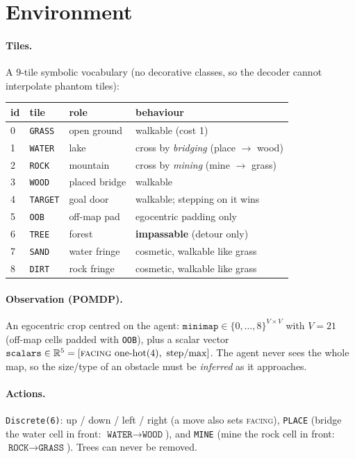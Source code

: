 \documentclass[11pt]{article}
\newcommand{\code}[1]{\texttt{#1}}
\begin{document}
\section{Environment}

\paragraph{Tiles.} A $9$-tile symbolic vocabulary (no decorative classes, so the
decoder cannot interpolate phantom tiles):
\begin{center}\small
\begin{tabular}{@{}llll@{}}
\toprule
id & tile & role & behaviour\\
\midrule
0 & \code{GRASS}  & open ground & walkable (cost 1)\\
1 & \code{WATER}  & lake        & cross by \emph{bridging} (place $\to$ wood)\\
2 & \code{ROCK}   & mountain    & cross by \emph{mining} (mine $\to$ grass)\\
3 & \code{WOOD}   & placed bridge & walkable\\
4 & \code{TARGET} & goal door   & walkable; stepping on it wins\\
5 & \code{OOB}    & off-map pad & egocentric padding only\\
6 & \code{TREE}   & forest      & \textbf{impassable} (detour only)\\
7 & \code{SAND}   & water fringe & cosmetic, walkable like grass\\
8 & \code{DIRT}   & rock fringe  & cosmetic, walkable like grass\\
\bottomrule
\end{tabular}
\end{center}

\paragraph{Observation (POMDP).} An egocentric crop centred on the agent:
$\code{minimap}\in\{0,\dots,8\}^{V\times V}$ with $V=21$ (off-map cells padded with
\code{OOB}), plus a scalar vector $\code{scalars}\in\mathbb{R}^{5}=[\textsc{facing}
\text{ one-hot}(4),\ \text{step}/\text{max}]$. The agent never sees the whole map,
so the size/type of an obstacle must be \emph{inferred} as it approaches.

\paragraph{Actions.} \code{Discrete(6)}: up / down / left / right (a move also sets
\textsc{facing}), \code{PLACE} (bridge the water cell in front: $\code{WATER}\to
\code{WOOD}$), and \code{MINE} (mine the rock cell in front: $\code{ROCK}\to
\code{GRASS}$). Trees can never be removed.
\end{document}
